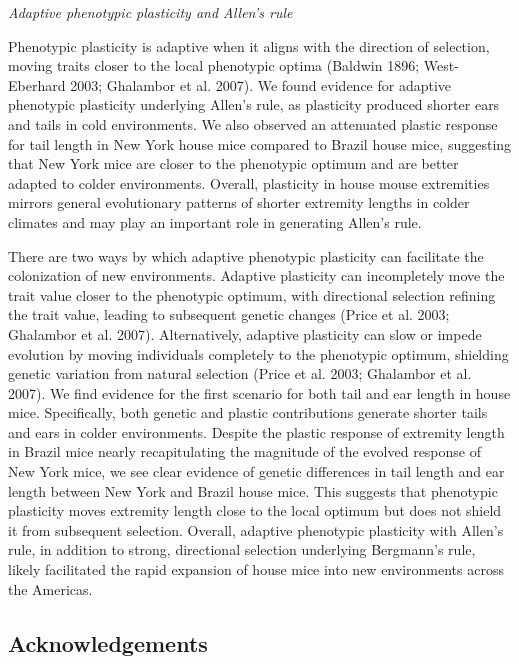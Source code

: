 \documentclass[]{article}
\begin{document}
\vspace{3.5mm}

\noindent\emph{Adaptive phenotypic plasticity and Allen's rule}

Phenotypic plasticity is adaptive when it aligns with the direction of
selection, moving traits closer to the local phenotypic optima (Baldwin
1896; West-Eberhard 2003; Ghalambor et al. 2007). We found evidence for
adaptive phenotypic plasticity underlying Allen's rule, as plasticity
produced shorter ears and tails in cold environments. We also observed
an attenuated plastic response for tail length in New York house mice
compared to Brazil house mice, suggesting that New York mice are closer
to the phenotypic optimum and are better adapted to colder environments.
Overall, plasticity in house mouse extremities mirrors general
evolutionary patterns of shorter extremity lengths in colder climates
and may play an important role in generating Allen's rule.

There are two ways by which adaptive phenotypic plasticity can
facilitate the colonization of new environments. Adaptive plasticity can
incompletely move the trait value closer to the phenotypic optimum, with
directional selection refining the trait value, leading to subsequent
genetic changes (Price et al. 2003; Ghalambor et al. 2007).
Alternatively, adaptive plasticity can slow or impede evolution by
moving individuals completely to the phenotypic optimum, shielding
genetic variation from natural selection (Price et al. 2003; Ghalambor
et al. 2007). We find evidence for the first scenario for both tail and
ear length in house mice. Specifically, both genetic and plastic
contributions generate shorter tails and ears in colder environments.
Despite the plastic response of extremity length in Brazil mice nearly
recapitulating the magnitude of the evolved response of New York mice,
we see clear evidence of genetic differences in tail length and ear
length between New York and Brazil house mice. This suggests that
phenotypic plasticity moves extremity length close to the local optimum
but does not shield it from subsequent selection. Overall, adaptive
phenotypic plasticity with Allen's rule, in addition to strong,
directional selection underlying Bergmann's rule, likely facilitated the
rapid expansion of house mice into new environments across the Americas.

\vspace{5mm}

\hypertarget{acknowledgements}{%
\subsection{Acknowledgements}\label{acknowledgements}}
\end{document}
